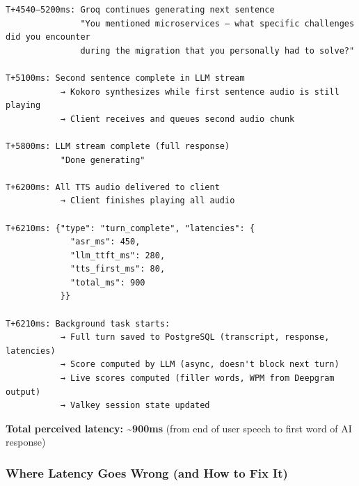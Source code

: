 \documentclass[
  11pt,
]{article}
\begin{document}
\begin{lstlisting}
T+4540–5200ms: Groq continues generating next sentence
               "You mentioned microservices — what specific challenges did you encounter
               during the migration that you personally had to solve?"
               
T+5100ms: Second sentence complete in LLM stream
           → Kokoro synthesizes while first sentence audio is still playing
           → Client receives and queues second audio chunk

T+5800ms: LLM stream complete (full response)
           "Done generating"

T+6200ms: All TTS audio delivered to client
           → Client finishes playing all audio

T+6210ms: {"type": "turn_complete", "latencies": {
             "asr_ms": 450,
             "llm_ttft_ms": 280,
             "tts_first_ms": 80,
             "total_ms": 900
           }}

T+6210ms: Background task starts:
           → Full turn saved to PostgreSQL (transcript, response, latencies)
           → Score computed by LLM (async, doesn't block next turn)
           → Live scores computed (filler words, WPM from Deepgram output)
           → Valkey session state updated
\end{lstlisting}

\textbf{Total perceived latency: \textasciitilde900ms} (from end of user
speech to first word of AI response)

\hypertarget{where-latency-goes-wrong-and-how-to-fix-it}{%
\subsubsection{Where Latency Goes Wrong (and How to Fix
It)}\label{where-latency-goes-wrong-and-how-to-fix-it}}
\end{document}
